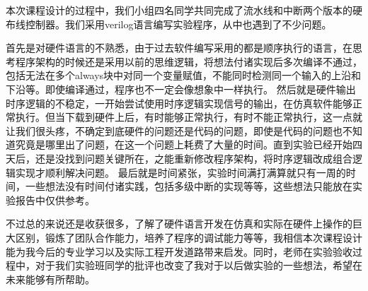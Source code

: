 本次课程设计的过程中，我们小组四名同学共同完成了流水线和中断两个版本的硬布线控制器。我们采用verilog语言编写实验程序，从中也遇到了不少问题。
\par
首先是对硬件语言的不熟悉，由于过去软件编写采用的都是顺序执行的语言，在思考程序架构的时候还是采用以前的思维逻辑，将想法付诸实现后多次编译不通过，包括无法在多个always块中对同一个变量赋值，不能同时检测同一个输入的上沿和下沿等。即使编译通过，程序也不一定会像想象中一样执行。
然后就是硬件输出时序逻辑的不稳定，一开始尝试使用时序逻辑实现信号的输出，在仿真软件能够正常执行。但当下载到硬件上后，有时能够正常执行，有时不能正常执行，这一点就让我们很头疼，不确定到底硬件的问题还是代码的问题，即使是代码的问题也不知道究竟是哪里出了问题，在这一个问题上耗费了大量的时间。直到实验已经开始四天后，还是没找到问题关键所在，之能重新修改程序架构，将时序逻辑改成组合逻辑实现才顺利解决问题。
最后就是时间紧张，实验时间满打满算就只有一周的时间，一些想法没有时间付诸实践，包括多级中断的实现等等，这些想法只能放在实验报告中仅供参考。
\par
不过总的来说还是收获很多，了解了硬件语言开发在仿真和实际在硬件上操作的巨大区别，锻炼了团队合作能力，培养了程序的调试能力等等，我相信本次课程设计能为我今后的专业学习以及实际工程开发道路带来启发。同时，老师在实验验收过程中，对于我们实验班同学的批评也改变了我对于以后做实验的一些想法，希望在未来能够有所帮助。
